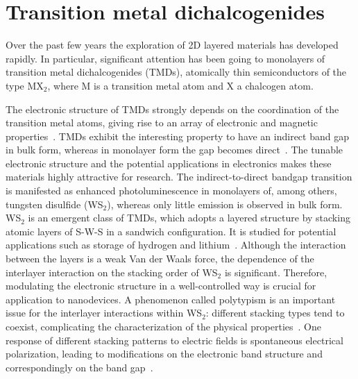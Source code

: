 \section{Transition metal dichalcogenides}
\label{sec:tmd}

Over the past few years the exploration of 2D layered materials
has developed rapidly. 
%
In particular, significant attention has been 
going to monolayers of transition metal dichalcogenides (TMDs),
atomically thin semiconductors of the type MX$_2$, where M is a 
transition metal atom and X a chalcogen atom. 
%

The electronic structure of TMDs strongly depends on the coordination 
of the transition metal atoms, giving rise to an array of electronic
and magnetic properties~\cite{Chhowalla:2013}.
%
TMDs exhibit the interesting property to have an indirect
band gap in bulk form, whereas in monolayer form the gap becomes
direct~\cite{Splendiani:2010}.
%
The tunable electronic structure and the potential applications in
electronics makes these materials highly attractive for research. 
%
The indirect-to-direct bandgap transition is manifested as enhanced
photoluminescence in monolayers of, among others, tungsten disulfide
(WS$_2$), whereas only little emission is observed in bulk form.
%
WS$_2$ is an emergent class of TMDs, which adopts a layered structure 
by stacking atomic layers of S-W-S in a sandwich configuration. 
%
It is studied for potential applications such as storage of hydrogen 
and lithium~\cite{Bhandavat:2012}.
%
Although the interaction between the layers is a weak Van der Waals 
force, the dependence of the interlayer interaction on the stacking 
order of WS$_2$ is significant. Therefore, modulating the electronic
structure in a well-controlled way is crucial for application to
nanodevices.
%
A phenomenon called polytypism is an important issue for the interlayer
interactions within WS$_2$: different stacking types tend to coexist, 
complicating the characterization of the physical properties~\cite{Na:2018}.
%
One response of different stacking patterns to electric fields is
spontaneous electrical polarization, leading to modifications on the 
electronic band structure and correspondingly on the band gap~\cite{Li:2016}.











